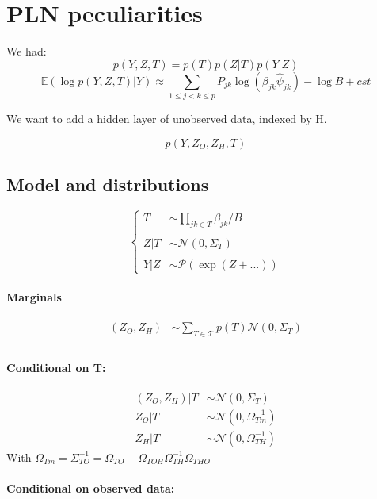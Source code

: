 \documentclass[11pt,a4paper]{article}
\newcommand{\Esp}{\mathds{E}}
\begin{document}
\section{PLN peculiarities}
We had: 
$$ p(Y,Z,T) = p(T)p(Z|T)p(Y|Z)$$
$$ \Esp(\log p(Y,Z,T)|Y) \approx \sum_{1 \leq j < k \leq p} P_{jk} \log\left(\beta_{jk} \hat{\psi}_{jk}\right) - \log B + cst$$

We want to add a hidden layer of unobserved data, indexed by H.

$$ p(Y,Z_O,Z_H,T)$$
\subsection{Model and distributions}
$$\left\{\begin{array}{rl}
T & \sim\prod_{jk \in T} \beta_{jk}/B \\\\

Z|T& \sim\mathcal{N}(0,\Sigma_T)\\\\

Y|Z&\sim\mathcal{P}( \exp( Z+...) )
\end{array} \right.$$

\paragraph{Marginals}
\begin{align*}
(Z_O,Z_H) &\sim \sum_{T \in \mathcal{T}} p(T) \mathcal{N}(0,\Sigma_T) \\
\end{align*}

\paragraph{Conditional on T:}
\begin{align*}
(Z_O,Z_H)|T & \sim\mathcal{N}(0,\Sigma_T)\\
Z_O|T & \sim\mathcal{N}(0,\Omega_{Tm}^{-1})\\
Z_H|T & \sim\mathcal{N}(0,\Omega_{TH}^{-1})
\end{align*}
With $ \Omega_{Tm} =\Sigma_{TO}^{-1} =  \Omega_{TO} - \Omega_{TOH}\Omega_{TH}^{-1}\Omega_{THO}$


\paragraph{Conditional on observed data:\\}
\end{document}
